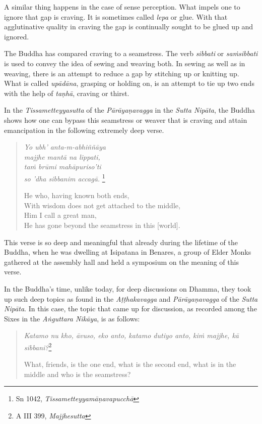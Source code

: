 A similar thing happens in the case of sense perception. What impels one to ignore that gap is craving. It is sometimes called \emph{lepa} or glue. With that agglutinative quality in craving the gap is continually sought to be glued up and ignored.

The Buddha has compared craving to a seamstress. The verb \emph{sibbati} or \emph{saṁsibbati} is used to convey the idea of sewing and weaving both. In sewing as well as in weaving, there is an attempt to reduce a gap by stitching up or knitting up. What is called \emph{upādāna}, grasping or holding on, is an attempt to tie up two ends with the help of \emph{taṇhā}, craving or thirst.

In the \emph{Tissametteyyasutta} of the \emph{Pārāyaṇavagga} in the \emph{Sutta Nipāta}, the Buddha shows how one can bypass this seamstress or weaver that is craving and attain emancipation in the following extremely deep verse.

\begin{quote}
\emph{Yo ubh' anta-m-abhiññāya}\\
\emph{majjhe mantā na lippati,}\\
\emph{taṁ brūmi mahāpuriso'ti}\\
\emph{so 'dha sibbanim accagā.} \footnote{Sn 1042, \emph{Tissametteyyamāṇavapucchā}}

He who, having known both ends,\\
With wisdom does not get attached to the middle,\\
Him I call a great man,\\
He has gone beyond the seamstress in this {[}world{]}.
\end{quote}

This verse is so deep and meaningful that already during the lifetime of the Buddha, when he was dwelling at Isipatana in Benares, a group of Elder Monks gathered at the assembly hall and held a symposium on the meaning of this verse.

In the Buddha's time, unlike today, for deep discussions on Dhamma, they took up such deep topics as found in the \emph{Aṭṭhakavagga} and \emph{Pārāyaṇavagga} of the \emph{Sutta Nipāta}. In this case, the topic that came up for discussion, as recorded among the Sixes in the \emph{Aṅguttara Nikāya}, is as follows:

\begin{quote}
\emph{Katamo nu kho, āvuso, eko anto, katamo dutiyo anto, kiṁ majjhe, kā sibbani?}\footnote{A III 399, \emph{Majjhesutta}}

What, friends, is the one end, what is the second end, what is in the middle and who is the seamstress?
\end{quote}

